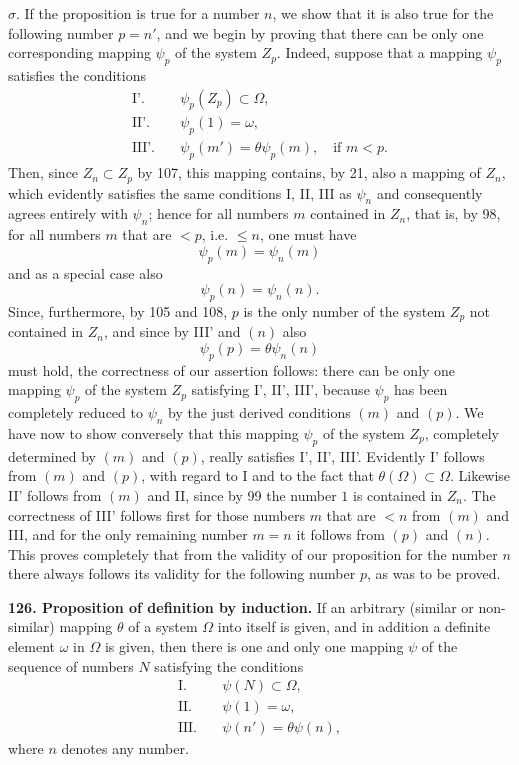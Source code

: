 \documentclass[11pt]{article}
\newcommand{\partof}{\mathrel{\subset}}
\begin{document}
\noindent $\sigma.$ If the proposition is true for a number $n$, we show that it is also true for the following number $p=n'$, and we begin by proving that there can be only one corresponding mapping $\psi_p$ of the system $Z_p$. Indeed, suppose that a mapping $\psi_p$ satisfies the conditions
\begin{align*}
\text{I'.}\quad& \psi_p(Z_p)\partof\Omega,\\
\text{II'.}\quad& \psi_p(1)=\omega,\\
\text{III'.}\quad& \psi_p(m')=\theta\psi_p(m),\quad \text{if }m<p.
\end{align*}
Then, since $Z_n\partof Z_p$ by 107, this mapping contains, by 21, also a mapping of $Z_n$, which evidently satisfies the same conditions I, II, III as $\psi_n$ and consequently agrees entirely with $\psi_n$; hence for all numbers $m$ contained in $Z_n$, that is, by 98, for all numbers $m$ that are $<p$, i.e. $\leq n$, one must have
\[
\psi_p(m)=\psi_n(m) \tag{m}
\]
and as a special case also
\[
\psi_p(n)=\psi_n(n). \tag{n}
\]
Since, furthermore, by 105 and 108, $p$ is the only number of the system $Z_p$ not contained in $Z_n$, and since by III' and $(n)$ also
\[
\psi_p(p)=\theta\psi_n(n) \tag{p}
\]
must hold, the correctness of our assertion follows: there can be only one mapping $\psi_p$ of the system $Z_p$ satisfying I', II', III', because $\psi_p$ has been completely reduced to $\psi_n$ by the just derived conditions $(m)$ and $(p)$. We have now to show conversely that this mapping $\psi_p$ of the system $Z_p$, completely determined by $(m)$ and $(p)$, really satisfies I', II', III'. Evidently I' follows from $(m)$ and $(p)$, with regard to I and to the fact that $\theta(\Omega)\partof\Omega$. Likewise II' follows from $(m)$ and II, since by 99 the number $1$ is contained in $Z_n$. The correctness of III' follows first for those numbers $m$ that are $<n$ from $(m)$ and III, and for the only remaining number $m=n$ it follows from $(p)$ and $(n)$. This proves completely that from the validity of our proposition for the number $n$ there always follows its validity for the following number $p$, as was to be proved.

\noindent\textbf{126. Proposition of definition by induction.} If an arbitrary (similar or non-similar) mapping $\theta$ of a system $\Omega$ into itself is given, and in addition a definite element $\omega$ in $\Omega$ is given, then there is one and only one mapping $\psi$ of the sequence of numbers $N$ satisfying the conditions
\begin{align*}
\text{I.}\quad& \psi(N)\partof\Omega,\\
\text{II.}\quad& \psi(1)=\omega,\\
\text{III.}\quad& \psi(n')=\theta\psi(n),
\end{align*}
where $n$ denotes any number.
\end{document}
